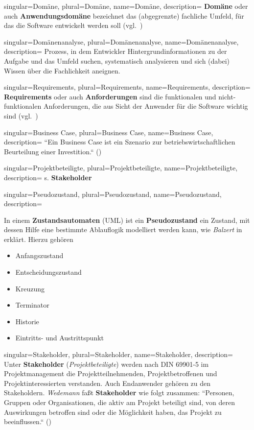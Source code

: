 {
singular={Domäne},
plural={Domäne},
name={Domäne},
description={
\textbf{Domäne} oder auch \textbf{Anwendungsdomäne} bezeichnet das (abgegrenzte) fachliche Umfeld, für das die Software entwickelt werden soll (vgl.~\cite[41]{Wed09})
}
}

{
singular={Domänenanalyse},
plural={Domänenanalyse},
name={Domänenanalyse},
description={
Prozess, in dem Entwickler Hintergrundinformationen zu der Aufgabe und das Umfeld suchen, systematisch analysieren und sich (dabei) Wissen über die Fachlichkeit aneignen.
}
}


{
singular={Requirements},
plural={Requirements},
name={Requirements},
description={
\textbf{Requirements} oder auch \textbf{Anforderungen} sind die funktionalen und nicht-funktionalen Anforderungen, die aus Sicht der Anwender für die Software wichtig sind  (vgl.~\cite[41]{Wed09})
}
}

{
singular={Business Case},
plural={Business Case},
name={Business Case},
description={
``Ein Business Case ist ein Szenario zur betriebswirtschaftlichen Beurteilung einer Investition.`` (\cite[11]{Brug09})
}
}

{
singular={Projektbeteiligte},
plural={Projektbeteiligte},
name={Projektbeteiligte},
description={
s. \textbf{Stakeholder}
}
}

{
singular={Pseudozustand},
plural={Pseudozustand},
name={Pseudozustand},
description={
In einem \textbf{Zustandsautomaten} (UML) ist ein \textbf{Pseudozustand} ein Zustand, mit dessen Hilfe eine bestimmte Ablauflogik modelliert werden kann, wie \textit{Balzert} in \cite[542]{Bal05} erklärt. Hierzu gehören
\begin{itemize}
\item Anfangszustand
\item Entscheidungszustand
\item Kreuzung
\item Terminator
\item Historie
\item Eintritts- und Austrittspunkt
\end{itemize}
}
}




{
singular={Stakeholder},
plural={Stakeholder},
name={Stakeholder},
description={
Unter \textbf{Stakeholder} (\textit{Projektbeteiligte}) werden nach DIN 69901-5 im Projektmanagement die Projektteilnehmenden,
Projektbetroffenen und Projektinteressierten verstanden.
Auch Endanwender gehören zu den Stakeholdern.
\textit{Wedemann} faßt \textbf{Stakeholder} wie folgt zusammen: ``Personen, Gruppen oder Organisationen, die aktiv am Projekt beteiligt sind, von deren Auswirkungen betroffen sind oder die Möglichkeit haben, das Projekt zu beeinflussen.`` (\cite[49]{Wed09})\\
}
}


